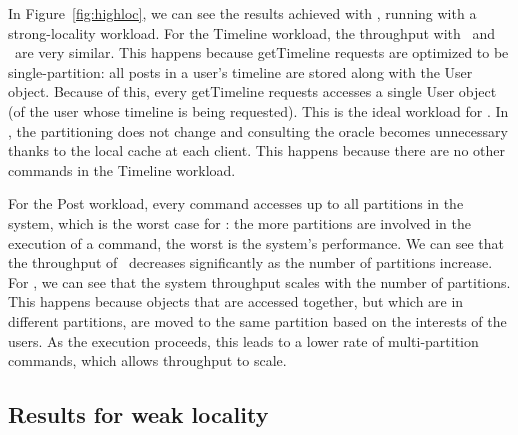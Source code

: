
In Figure~\ref{fig:highloc}, we can see the results achieved with \appname{}, running with a strong-locality workload.
For the Timeline workload, the throughput with \dssmr\ and \ssmr\ are very similar.
This happens because getTimeline requests are optimized to be single-partition:
all posts in a user's timeline are stored along with the User object.
Because of this, every getTimeline requests accesses a single User object (of the user whose timeline is being requested).
This is the ideal workload for \ssmr{}.
In \dssmr{}, the partitioning does not change and consulting the oracle becomes unnecessary thanks to the local cache at each client.
This happens because there are no other commands in the Timeline workload.

For the Post workload, every command accesses up to all partitions in the system, which is the worst case for \ssmr{}: the more partitions are involved in the execution of a command, the worst is the system's performance.
We can see that the throughput of \ssmr\ decreases significantly as the number of partitions increase.
For \dssmr{}, we can see that the system throughput scales with the number of partitions.
This happens because objects that are accessed together, but which are in different partitions, are moved to the same partition based on the interests of the users.
As the execution proceeds, this leads to a lower rate of multi-partition commands, which allows throughput to scale.



\subsection{Results for weak locality}
\label{sec:evaluation:lowloc}
